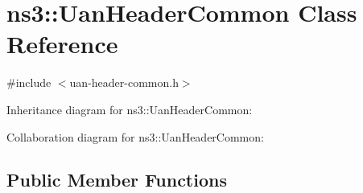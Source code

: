 \hypertarget{classns3_1_1UanHeaderCommon}{}\section{ns3\+:\+:Uan\+Header\+Common Class Reference}
\label{classns3_1_1UanHeaderCommon}


{\ttfamily \#include $<$uan-\/header-\/common.\+h$>$}



Inheritance diagram for ns3\+:\+:Uan\+Header\+Common\+:


Collaboration diagram for ns3\+:\+:Uan\+Header\+Common\+:
\subsection*{Public Member Functions}
